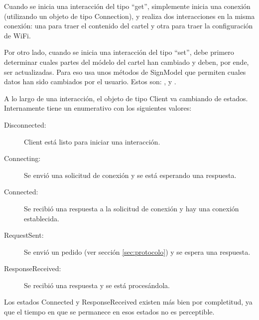 Cuando se inicia una interacción del tipo \enquote{get}, simplemente inicia una conexión (utilizando un objeto de tipo Connection), y realiza dos interacciones en la misma conexión: una para traer el contenido del cartel y otra para traer la configuración de WiFi.

Por otro lado, cuando se inicia una interacción del tipo \enquote{set}, debe primero determinar cuales partes del módelo del cartel han cambiado y deben, por ende, ser actualizadas. Para eso usa unos métodos de SignModel que permiten cuales datos han sido cambiados por el usuario. Estos son: ,  y .

A lo largo de una interacción, el objeto de tipo Client va cambiando de estados. Internamente tiene un enumerativo con los siguientes valores:
\begin{description}
	\item[Disconnected:] Client está listo para iniciar una interacción.
	\item[Connecting:] Se envió una solicitud de conexión y se está esperando una respuesta.
	\item[Connected:] Se recibió una respuesta a la solicitud de conexión y hay una conexión establecida.
	\item[RequestSent:] Se envió un pedido (ver sección \ref{sec:protocolo}) y se espera una respuesta.
	\item[ResponseReceived:] Se recibió una respuesta y se está procesándola.
\end{description}

Los estados Connected y ResponseReceived existen más bien por completitud, ya que el tiempo en que se permanece en esos estados no es perceptible.

